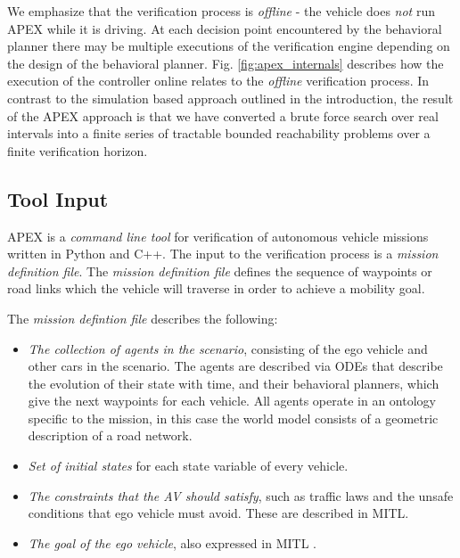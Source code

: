 We emphasize that the verification process is \emph{offline} - the vehicle does \emph{not} run APEX while it is driving.
At each decision point encountered by the behavioral planner there may be multiple executions of the verification engine depending on the design of the behavioral planner. Fig. \ref{fig:apex_internals} describes how the execution of the controller online relates to the \emph{offline} verification process. In contrast to the simulation based approach outlined in the introduction, the result of the APEX approach is that we have converted a brute force search over real intervals into a finite series of tractable bounded reachability problems over a finite verification horizon.

\subsection{Tool Input}
APEX is a \emph{command line tool} for verification of autonomous vehicle missions written in Python and C++.
The input to the verification process is a \emph{mission definition file}. 
The \emph{mission definition file} defines the sequence of waypoints or road links which the vehicle will traverse in order to achieve a mobility goal. 

The \emph{mission defintion file} describes the following:
\begin{itemize}
	\item \emph{The collection of agents in the scenario}, consisting of the ego vehicle and other cars in the scenario.
	The agents are described via ODEs that describe the evolution of their state with time, and their behavioral planners, which give the next waypoints for each vehicle.
	All agents operate in an ontology specific to the mission, in this case the world model consists of a geometric description of a road network. 
	\item \emph{Set of initial states} for each state variable of every vehicle.
	\item \emph{The constraints that the AV should satisfy}, such as traffic laws and the unsafe conditions that ego vehicle must avoid. These are described in MITL. 
	\item \emph{The goal of the ego vehicle}, also expressed in MITL \cite{alur1996benefits}. 
\end{itemize}

